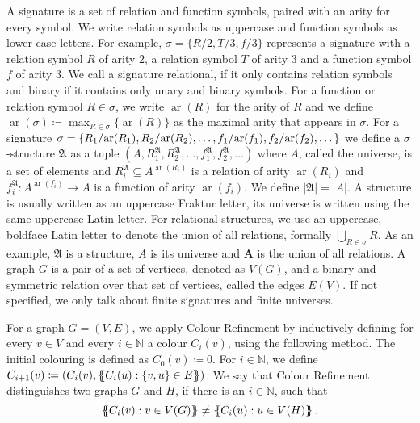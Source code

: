 A signature is a set of relation and function symbols, paired with an arity for every symbol.
We write relation symbols as uppercase and function symbols as lower case letters.
For example, $\sigma=\{R/2, T/3, f/3\}$ represents a signature with a relation symbol $R$ of arity $2$, a relation symbol $T$ of arity $3$ and a function symbol $f$ of arity $3$.
We call a signature relational, if it only contains relation symbols and binary if it contains only unary and binary symbols.
For a function or relation symbol $R\in \sigma$, we write $\operatorname{ar}(R)$ for the arity of $R$ and we define $\operatorname{ar}(\sigma)\coloneqq \max_{R\in\sigma}\{\operatorname{ar}(R)\}$ as the maximal arity that appears in $\sigma$.
For a signature 
$\sigma=\{R_1/\kern-.15em\operatorname{ar}(R_1), R_2/\kern-.15em\operatorname{ar}(R_2), \dots, f_1/\kern-.15em\operatorname{ar}(f_1),f_2/\kern-.15em\operatorname{ar}(f_2),\dots\}$
 we define a $\sigma$-structure $\mathfrak A$ as a tuple $(A,R_1^{\mathfrak A},R_2^{\mathfrak A},\dots,f_1^{\mathfrak A},f_2^{\mathfrak A},\dots)$ where $A$, called the universe, is a set of elements and $R_i^{\mathfrak A}\subseteq A^{\operatorname{ar}(R_i)}$ is a relation of arity $\operatorname{ar}(R_i)$ and $f_i^{\mathfrak A}:A^{\operatorname{ar}(f_i)}\to A$ is a function of arity $\operatorname{ar}(f_i)$.
We define $\vert \mathfrak A\vert =\vert A \vert$.
A structure is usually written as an uppercase Fraktur letter, its universe is written using the same uppercase Latin letter.
For relational structures, we use an uppercase, boldface Latin letter to denote the union of all relations, formally $\bigcup_{R\in\sigma}R$.
As an example, $\mathfrak A$ is a structure, $A$ is its universe and $\mathbf A$ is the union of all relations.
A graph $G$ is a pair of a set of vertices, denoted as $V(G)$, and a binary and symmetric relation over that set of vertices, called the edges $E(V)$.
If not specified, we only talk about finite signatures and finite universes.

For a graph $G=(V,E)$, we apply Colour Refinement by inductively defining for every $v\in V$ and every $i\in \mathbb N$ a colour $C_i(v)$, using the following method.
The initial colouring is defined as $C_0(v)\coloneqq0$.
For $i\in \mathbb N$, we define $C_{i+1}(v)\coloneqq(C_i(v), \left\{\kern-.35em\left\{C_i(u) : \{v,u\}\in E\right\}\kern-.35em\right\})$.
We say that Colour Refinement distinguishes two graphs $G$ and $H$, if there is an $i\in \mathbb N$, such that 
$$\left\{\kern-.35em\left\{C_i(v) : v\in V(G)\right\}\kern-.35em\right\}\neq \left\{\kern-.35em\left\{C_i(u) : u \in V(H)\right\}\kern-.35em\right\}.$$

